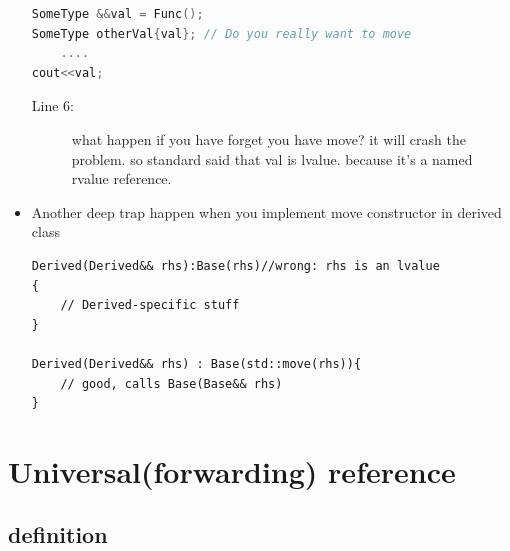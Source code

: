 \documentclass[a4paper,11pt,twoside]{book}
\begin{document}
\begin{itemize}
\begin{lstlisting}[frame=single, language=c++]
SomeType &&val = Func();
SomeType otherVal{val}; // Do you really want to move 
	....
cout<<val; 
\end{lstlisting}
\begin{description}
	\item[Line 6:] what happen if you have forget you have move? it will crash the problem. so standard said that val is lvalue. because it's a named rvalue reference.
\end{description}
	
    \item Another deep trap happen when you implement move constructor in derived class
\begin{lstlisting}[numbers=none]
Derived(Derived&& rhs):Base(rhs)//wrong: rhs is an lvalue
{
	// Derived-specific stuff
}
	
Derived(Derived&& rhs) : Base(std::move(rhs)){
	// good, calls Base(Base&& rhs)
}
\end{lstlisting}
	
\end{itemize}



\section{Universal(forwarding) reference }
\subsection{definition}
\end{document}
